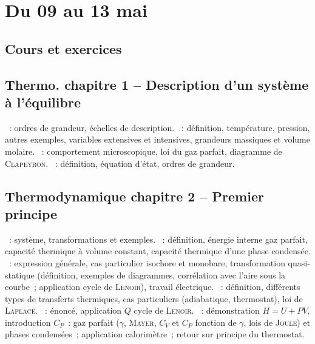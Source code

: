 \documentclass[a4paper, 12pt, final, garamond]{book}
\begin{document}
\setcounter{chapter}{25}

\chapter{Du 09 au 13 mai}

\section{Cours et exercices}

\section*{Thermo. chapitre 1 -- Description d'un système à l'équilibre}
\begin{enumerate}[label=\Roman*]
  ~: ordres de grandeur, échelles de description.
  ~: définition, température, pression, autres exemples,
    variables extensives et intensives, grandeurs massiques et volume molaire.
  ~: comportement microscopique, loi du gaz parfait,
    diagramme de \textsc{Clapeyron}.
  ~: définition, équation d'état, ordres de
    grandeur.
\end{enumerate}

\section*{Thermodynamique chapitre 2 -- Premier principe}
\begin{enumerate}[label=\Roman*]
  ~: système, transformations et exemples.
  ~: définition, énergie interne gaz parfait, capacité
    thermique à volume constant, capacité thermique d'une phase condensée.
  ~: expression générale, cas particulier
    isochore et monobare, transformation quasi-statique (définition, exemples de
    diagrammes, corrélation avec l'aire sous la courbe~; application cycle de
    \textsc{Lenoir}), travail électrique.
  ~: définition, différents types de transferts
    thermiques, cas particuliers (adiabatique, thermostat), loi de
    \textsc{Laplace}.
  ~: énoncé, application $Q$ cycle
    de \textsc{Lenoir}.
  ~: démonstration $H = U+PV$,
    introduction $C_{P}$~: gaz parfait ($\gamma$, \textsc{Mayer}, $C_{V}$ et
    $C_P$ fonction de $\gamma$, lois de \textsc{Joule}) et phases condensées~;
    application calorimètre~; retour sur principe du thermostat.
\end{enumerate}
\end{document}
